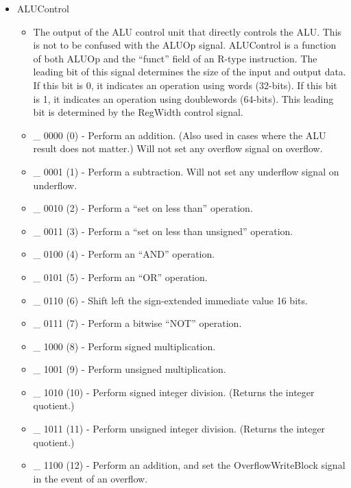\documentclass[
    paper=letter,
    parskip=half,
    fontsize=12pt,
    titlepage=firstiscover,
    toc=bibliography,
    numbers=endperiod
]{scrartcl}
\providecommand{\tightlist}{%
  \setlength{\itemsep}{0pt}\setlength{\parskip}{0pt}}
\begin{document}
\begin{itemize}
    \item ALUControl
          \begin{itemize}
              \tightlist
              \item The output of the ALU control unit that directly controls the ALU. This
                    is not to be confused with the ALUOp signal. ALUControl is a function of
                    both ALUOp and the ``funct'' field of an R-type instruction. The leading
                    bit of this signal determines the size of the input and output data. If
                    this bit is 0, it indicates an operation using words (32-bits). If this
                    bit is 1, it indicates an operation using doublewords (64-bits). This
                    leading bit is determined by the RegWidth control signal.
              \item \_ 0000 (0) - Perform an addition. (Also used in cases where the ALU result does not matter.) Will not set any overflow signal on overflow.
              \item \_ 0001 (1) - Perform a subtraction. Will not set any underflow signal on underflow.
              \item \_ 0010 (2) - Perform a ``set on less than'' operation.
              \item \_ 0011 (3) - Perform a ``set on less than unsigned'' operation.
              \item \_ 0100 (4) - Perform an ``AND'' operation.
              \item \_ 0101 (5) - Perform an ``OR'' operation.
              \item \_ 0110 (6) - Shift left the sign-extended immediate value 16 bits.
              \item \_ 0111 (7) - Perform a bitwise ``NOT'' operation.
              \item \_ 1000 (8) - Perform signed multiplication.
              \item \_ 1001 (9) - Perform unsigned multiplication.
              \item \_ 1010 (10) - Perform signed integer division. (Returns the integer quotient.)
              \item \_ 1011 (11) - Perform unsigned integer division. (Returns the integer quotient.)
              \item \_ 1100 (12) - Perform an addition, and set the OverflowWriteBlock signal in the event of an overflow.
          \end{itemize}


\end{itemize}
\end{document}

